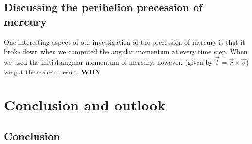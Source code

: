 \documentclass[a4paper, 10pt]{article}
\begin{document}
\subsection{Discussing the perihelion precession of mercury}
One interesting aspect of our investigation of the precession of mercury is that it broke down when we computed the angular momentum at every time step. When we used the initial angular momentum of mercury, however, (given by $\vec{l}=\vec{r}\times \vec{v}$) we got the correct result. \textbf{WHY}
\section{Conclusion and outlook}
\subsection{Conclusion}
\end{document}
